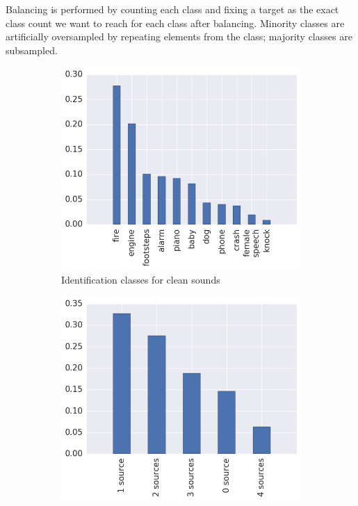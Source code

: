 Balancing is performed by counting each class and fixing a target as the exact class count we want to reach for each class after balancing. Minority classes are artificially oversampled by repeating elements from the class; majority classes are subsampled.
\begin{figure}[htb]
\begin{subfigure}[t]{0.5\textwidth}
	\centering
	\includegraphics[scale=0.4,valign=t]{images-data/class_count_clean}
	\caption{Identification classes for clean sounds}
	\label{fig:methods:class_count_clean}
\end{subfigure}%
\begin{subfigure}[t]{0.5\textwidth}
	\centering
	\includegraphics[scale=0.4,valign=t]{images-data/class_count_sources}

\end{subfigure}
\end{figure}
